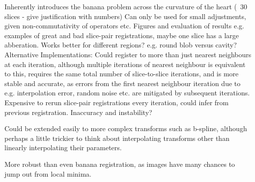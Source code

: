   Inherently introduces the banana problem across the curvature of the heart (~30 slices - give justification with numbers)
  Can only be used for small adjustments, given non-commutativity of operators etc.
  Figures and evaluation of results e.g. examples of great and bad slice-pair registrations, maybe one slice has a large abberation. Works better for different regions? e.g. round blob versus cavity?
  Alternative Implementations:
  Could register to more than just nearest neighbours at each iteration, although multiple iterations of nearest neighbour is equivalent to this, requires the same total number of slice-to-slice iterations, and is more stable and accurate, as errors from the first nearest neighbour iteration due to e.g. interpolation error, random noise etc. are mitigated by subsequent iterations.
  Expensive to rerun slice-pair registrations every iteration, could infer from previous registration. Inaccuracy and instability?
  
  Could be extended easily to more complex transforms such as b-spline, although perhaps a little trickier to think about interpolating transforms other than linearly interpolating their parameters.
  
  More robust than even banana registration, as images have many chances to jump out from local minima.


